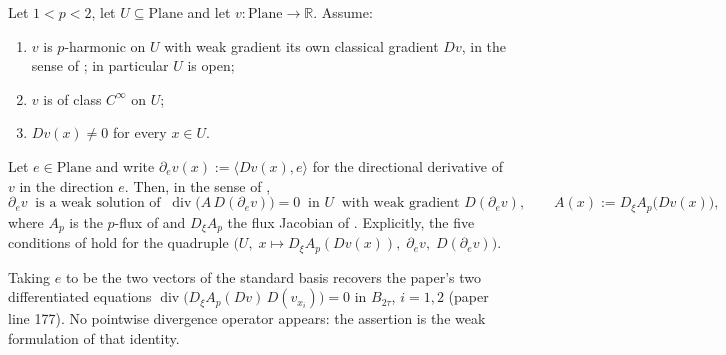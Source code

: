 \begin{lemma}
Let $1<p<2$, let $U\subseteq\mathrm{Plane}$ and let $v\colon\mathrm{Plane}\to\mathbb{R}$.
Assume:
\begin{enumerate}
\item[(H1)] $v$ is $p$-harmonic on $U$ with weak gradient its own classical gradient $Dv$, in
the sense of ; in particular $U$ is open;
\item[(H2)] $v$ is of class $C^{\infty}$ on $U$;
\item[(H3)] $Dv(x)\ne0$ for every $x\in U$.
\end{enumerate}
Let $e\in\mathrm{Plane}$ and write $\partial_ev(x):=\langle Dv(x),e\rangle$ for the directional
derivative of $v$ in the direction $e$.  Then, in the sense of ,
\[
  \partial_ev\ \text{ is a weak solution of }\
  \operatorname{div}\bigl(A\,D(\partial_ev)\bigr)=0\ \text{ in }U\
  \text{ with weak gradient }D(\partial_ev),
  \qquad A(x):=D_\xi A_p\bigl(Dv(x)\bigr),
\]
where $A_p$ is the $p$-flux of  and $D_\xi A_p$ the flux Jacobian of
.  Explicitly, the five conditions of  hold for
the quadruple $\bigl(U,\;x\mapsto D_\xi A_p(Dv(x)),\;\partial_ev,\;D(\partial_ev)\bigr)$.

Taking $e$ to be the two vectors of the standard basis recovers the paper's two differentiated
equations $\operatorname{div}\bigl(D_\xi A_p(Dv)\,D(v_{x_i})\bigr)=0$ in $B_{2\tau}$, $i=1,2$
(paper line 177).  No pointwise divergence operator appears: the assertion is the weak
formulation of that identity.
\end{lemma}
